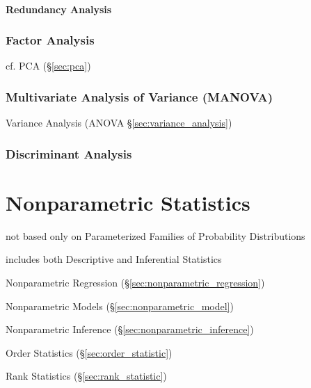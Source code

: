 \paragraph{Redundancy Analysis}\label{sec:redundancy_analysis}\hfill



\subsubsection{Factor Analysis}\label{sec:factor_analysis}

cf. PCA (\S\ref{sec:pca})



\subsubsection{Multivariate Analysis of Variance (MANOVA)}\label{sec:manova}

Variance Analysis (ANOVA \S\ref{sec:variance_analysis})



\subsubsection{Discriminant Analysis}\label{sec:discriminant_analysis}



\section{Nonparametric Statistics}\label{sec:nonparametric_statistics}

not based only on Parameterized Families of Probability Distributions

includes both Descriptive and Inferential Statistics

Nonparametric Regression (\S\ref{sec:nonparametric_regression})

Nonparametric Models (\S\ref{sec:nonparametric_model})

Nonparametric Inference (\S\ref{sec:nonparametric_inference})

Order Statistics (\S\ref{sec:order_statistic})

Rank Statistics (\S\ref{sec:rank_statistic})



